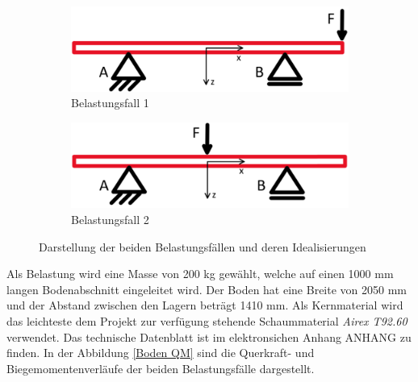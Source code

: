 \begin{figure}[!ht]
  \centering
    \begin{subfigure}{.5\textwidth}
      \centering
      \includegraphics[width=.8\linewidth]{04_figures/Boden Fall1.png}
      \caption{Belastungsfall 1}
      \label{Belastungsfall 1}
    \end{subfigure}%
    \begin{subfigure}{.5\textwidth}
      \centering
      \includegraphics[width=.8\linewidth]{04_figures/Boden Fall2.png}
      \caption{Belastungsfall 2}
      \label{Belastungsfall 2}
    \end{subfigure}%
  \caption{Darstellung der beiden Belastungsfällen und deren Idealisierungen}
\label{Boden Idealisierung}
\end{figure}

Als Belastung wird eine Masse von 200 kg gewählt, welche auf einen 1000 mm langen Bodenabschnitt eingeleitet wird. Der Boden hat eine Breite von 2050 mm und der Abstand zwischen den Lagern beträgt 1410 mm. Als Kernmaterial wird das leichteste dem Projekt zur verfügung stehende Schaummaterial \emph{Airex T92.60} verwendet. Das technische Datenblatt ist im elektronsichen Anhang ANHANG zu finden. In der Abbildung \ref{Boden QM} sind die Querkraft- und Biegemomentenverläufe der beiden Belastungsfälle dargestellt.

